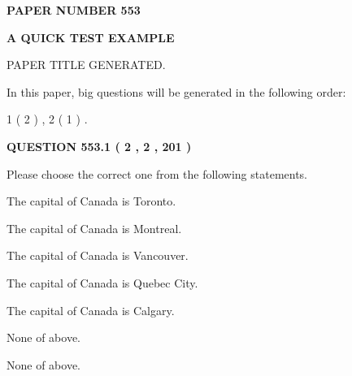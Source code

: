 \documentclass[12pt]{article}
\begin{document}
   
   
   
\newpage 
\setcounter{page}{ 
   553001 } 
   
   
   
   
 {\textbf{ \Large{ PAPER NUMBER  553  }}}
   
   
\vspace{0.2in}
   
   
   
   
   
   
   
   
 \vspace{0.2in}
{\LARGE {\textbf{ A QUICK TEST EXAMPLE}}}
   
   
 PAPER TITLE GENERATED.
   
   
   
\vspace{0.2in}
   
In this paper, big questions will be generated in the following order: 
   
   
   1 ( 2 )
 ,
   2 ( 1 )
 .
  
\vspace{0.2in}
  
{\textbf{\Large{QUESTION
553.1 
 ( 2 , 2 , 201 )
}}}
  
  
Please choose the correct one from the following statements.
 
 
The capital of Canada is Toronto.
 
 
The capital of Canada is Montreal.
 
 
The capital of Canada is Vancouver.
 
 
The capital of Canada is Quebec City.
 
 
The capital of Canada is Calgary.
 
 
 None of above.
 
 
\noindent{}
 
 
 None of above.
 
 
\noindent{}
 
 
   
   
   
\end{document}
